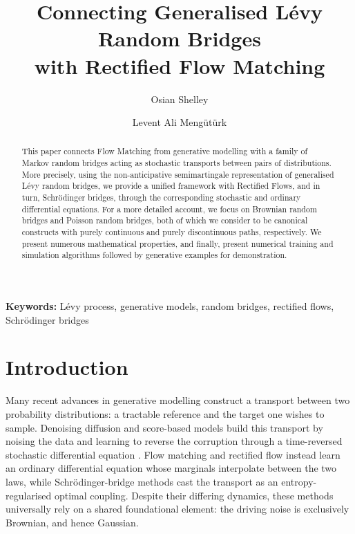 \documentclass{article}
\newcommand{\levy}{{L\'evy }}
\newcommand{\Schrodinger}{Schr\"odinger\xspace}
\theoremstyle{definition}
\begin{document}
\title{Connecting Generalised \levy Random Bridges \\ 
with Rectified Flow Matching}
\author[1]{Osian Shelley}
\author[1,2]{Levent Ali Meng\"ut\"urk}



\date{}
\maketitle
\begin{abstract}
This paper connects Flow Matching from generative modelling with a family of Markov random bridges acting as stochastic transports between pairs of distributions. More precisely, using the non-anticipative semimartingale representation of generalised \levy random bridges, we provide a unified framework with Rectified Flows, and in turn, \Schrodinger bridges, through the corresponding stochastic and ordinary differential equations. For a more detailed account, we focus on Brownian random bridges and Poisson random bridges, both of which we consider to be canonical constructs with purely continuous and purely discontinuous paths, respectively. We present numerous mathematical properties, and finally, present numerical training and simulation algorithms followed by generative examples for demonstration.
\end{abstract}
{\bf Keywords:} \levy process, generative models, random bridges, rectified flows, \Schrodinger bridges

\section{Introduction}\label{sec:intro}

Many recent advances in generative modelling construct a transport between two probability distributions: a tractable reference and the target one wishes to sample. Denoising diffusion and score-based models \cite{HoJainAbbeel2020,nichol_improved_2021,SongMengErmon2021,song_score-based_2021} build this transport by noising the data and learning to reverse the corruption through a time-reversed stochastic differential equation \cite{anderson_reverse-time_1982,HaussmannPardoux1986,MilletNualartSanz1989}. Flow matching and rectified flow \cite{LipmanChen2023,liu_flow_2023,TongFatras2024} instead learn an ordinary differential equation whose marginals interpolate between the two laws, while \Schrodinger-bridge methods \cite{debortoli2021diffusion,shi2023diffusion} cast the transport as an entropy-regularised optimal coupling. Despite their differing dynamics, these methods universally rely on a shared foundational element: the driving noise is exclusively Brownian, and hence Gaussian.
\end{document}
